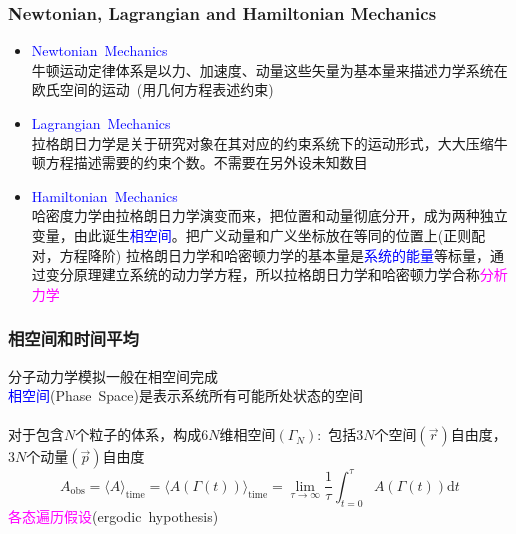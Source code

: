 \frame
{
	\frametitle{\textrm{\small Newtonian, Lagrangian and Hamiltonian Mechanics}}
	\begin{itemize}
   		\setlength{\itemsep}{10pt}
		\item \textrm{\textcolor{blue}{Newtonian~Mechanics}}\\
		牛顿运动定律体系是以力、加速度、动量这些矢量为基本量来描述力学系统在欧氏空间的运动~(用几何方程表述约束)
	\item \textrm{\textcolor{blue}{Lagrangian~Mechanics}}\\
		拉格朗日力学是关于研究对象在其对应的约束系统下的运动形式，大大压缩牛顿方程描述需要的约束个数。不需要在另外设未知数目
	\item \textrm{\textcolor{blue}{Hamiltonian~Mechanics}}\\
		哈密度力学由拉格朗日力学演变而来，把位置和动量彻底分开，成为两种独立变量，由此诞生\textcolor{blue}{相空间}。把广义动量和广义坐标放在等同的位置上(正则配对，方程降阶)
		\vskip 6pt
		拉格朗日力学和哈密顿力学的基本量是\textcolor{blue}{系统的能量}等标量，通过变分原理建立系统的动力学方程，所以拉格朗日力学和哈密顿力学合称\textcolor{magenta}{分析力学}
	\end{itemize}
}

\frame
{
	\frametitle{相空间和时间平均}
	分子动力学模拟一般在相空间完成\\
	\vskip 3pt
	\textcolor{blue}{相空间}\textrm{(Phase~Space)}是表示系统所有可能所处状态的空间\\
	\vskip 5pt
{\fontsize{8.5pt}{6.2pt}}\\
	\vskip 8pt
	对于包含$N$个粒子的体系，构成$6N$维相空间$(\Gamma_N)$:~包括$3N$个空间$(\vec r)$自由度，$3N$个动量$(\vec p)$自由度
	\vskip 5pt
{\fontsize{8.2pt}{6.2pt}}
	\begin{displaymath}
		A_{\mathrm{obs}}=\langle A\rangle_{\mathrm{time}}=\langle A(\Gamma(t))\rangle_{\mathrm{time}}=\lim_{\tau\rightarrow\infty}\dfrac1{\tau}\int_{t=0}^{\tau}A(\Gamma(t))\mathrm{d}t
	\end{displaymath}
	\textcolor{magenta}{各态遍历假设}\textrm{(ergodic~hypothesis)}\\
	\vskip 5pt
{\fontsize{9.5pt}{6.2pt}}
}

